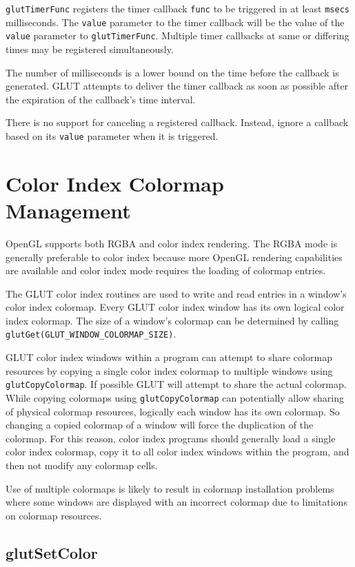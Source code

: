 {\tt glutTimerFunc} registers the timer callback {\tt func} to be triggered
in at least {\tt msecs} milliseconds.  The {\tt value} parameter to the timer
callback will be the value of the {\tt value} parameter to {\tt glutTimerFunc}.
Multiple timer callbacks at same or differing times may be registered
simultaneously.

The number of milliseconds is a lower bound on the time before the
callback is generated.  GLUT attempts to deliver the timer callback
as soon as possible after the expiration of the callback's time interval.

There is no support for canceling a registered callback.  Instead,
ignore a callback based on its {\tt value} parameter when it is triggered.

\section{Color Index Colormap Management}

OpenGL supports both RGBA and color index rendering.  The RGBA mode is generally
preferable to color index because more OpenGL rendering capabilities are
available and color index mode requires the loading of colormap entries.

The GLUT color index routines are used to write and read entries in a window's
color index colormap.  Every GLUT color index window has its own logical color
index colormap.  The size of a window's colormap can be determined by calling
{\tt glutGet(GLUT\_WINDOW\_COLORMAP\_SIZE)}.

GLUT color index windows within a program can attempt to share colormap resources
by copying a single color index colormap to multiple windows using {\tt glutCopyColormap}.
If possible GLUT will attempt to share the actual colormap.  While copying
colormaps using {\tt glutCopyColormap} can potentially allow sharing of
physical colormap resources, logically each window has its own colormap.  So
changing a copied colormap of a window will force the duplication of the colormap.
For this reason, color index programs should generally load a single color index
colormap, copy it to all color index windows within the program, and then not
modify any colormap cells.

Use of multiple colormaps is likely to result in
colormap installation problems where some windows are
displayed with an incorrect colormap due to limitations on colormap
resources.

\subsection{glutSetColor}

